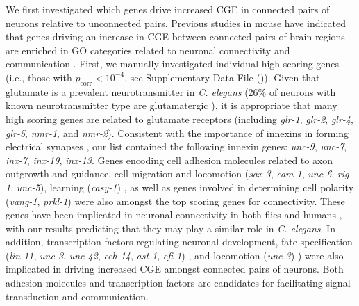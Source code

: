 {We first investigated which genes drive increased CGE in connected pairs of neurons relative to unconnected pairs.
Previous studies in mouse have indicated that genes driving an increase in CGE between connected pairs of brain regions are enriched in GO categories related to neuronal connectivity and communication \citep{Fulcher2016, Ji2014, Fakhry2015a, French2011}.
First, we manually investigated individual high-scoring genes (i.e., those with $p_\mathrm{corr} < 10^{-4}$, see Supplementary Data File ()).
Given that glutamate is a prevalent neurotransmitter in \textit{C. elegans} (26\% of neurons with known neurotransmitter type are glutamatergic \citep{Pereira2015}), it is appropriate that many high scoring genes are related to glutamate receptors (including \emph{glr-1}, \emph{glr-2}, \emph{glr-4}, \emph{glr-5}, \emph{nmr-1}, and \emph{nmr-2}).
Consistent with the importance of innexins in forming electrical synapses \citep{Starich2001}, our list contained the following innexin genes: \emph{unc-9}, \emph{unc-7}, \emph{inx-7}, \emph{inx-19}, \emph{inx-13}.
Genes encoding cell adhesion molecules related to axon outgrowth and guidance, cell migration and locomotion (\emph{sax-3}, \emph{cam-1}, \emph{unc-6}, \emph{rig-1}, \emph{unc-5}), learning (\emph{casy-1}) \citep{Zallen1999, Garriga1999, Leung-Hagesteijn1992, Harris2010, Ikeda2008},
as well as genes involved in determining cell polarity (\emph{vang-1}, \emph{prkl-1}) \citep{Wu2006, Hoffmann2010} were also amongst the top scoring genes for connectivity.
These genes have been implicated in neuronal connectivity in both flies and humans \citep{Paemka2013, Ehaideb2016, Sowers2013}, with our results predicting that they may play a similar role in \textit{C. elegans}.
In addition, transcription factors regulating neuronal development,
fate specification (\emph{lin-11}, \emph{unc-3}, \emph{unc-42}, \emph{ceh-14}, \emph{ast-1}, \emph{cfi-1}) \citep{Sarafi-Reinach2001, Prasad2008, Baran1999, Cassata2000, Schmid2006, Shaham2002a},
and locomotion (\emph{unc-3}) \citep{Prasad2008}) were also implicated in driving increased CGE amongst connected pairs of neurons.
Both adhesion molecules and transcription factors are candidates for facilitating signal transduction and communication.

}
